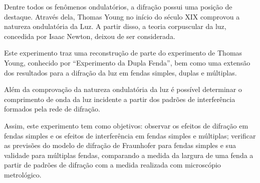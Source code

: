 Dentre todos os fenômenos ondulatórios, a difração possui uma posição de destaque. Através dela, Thomas Young no início do século XIX comprovou a natureza ondulatória da Luz. A partir disso, a teoria corpuscular da luz, concedida por Isaac Newton, deixou de ser considerada. 

Este experimento traz uma reconstrução de parte do experimento de Thomas Young, conhecido por “Experimento da Dupla Fenda”, bem como uma extensão dos resultados para a difração da luz em fendas simples, duplas e múltiplas. 

Além da comprovação da natureza ondulatória da luz é possível determinar o comprimento de onda da luz incidente a partir dos padrões de interferência formados pela rede de difração. 

Assim, este experimento tem como objetivos: observar os efeitos de difração em fendas simples e os efeitos de interferência em fendas simples e múltiplas; verificar as previsões do modelo de difração de Fraunhofer para fendas simples e sua validade para múltiplas fendas, comparando a medida da largura de uma fenda a partir de padrões de difração com a medida realizada com microscópio metrológico.

